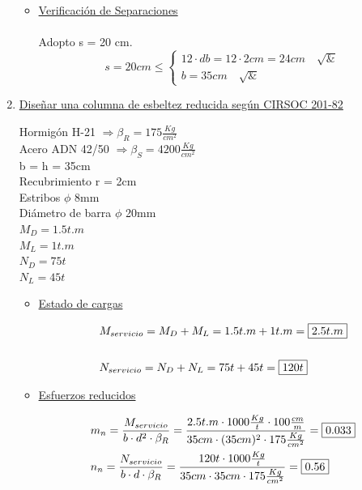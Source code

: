 \begin{enumerate}
\begin{itemize}
\item \underline{Verificación de Separaciones}\\
\\
Adopto s = 20 cm.\\
\[ s = 20cm \leq \left\{ \begin{array}{ll}
         12 \cdot db = 12 \cdot 2cm = 24cm \quad \surd &\\
         b = 35cm \quad \surd & \end{array} \right. \] 
\end{itemize}
\newpage
\item \underline{Diseñar una columna de esbeltez reducida según CIRSOC 201-82}

Hormigón H-21 $\Rightarrow \beta_R = 175 \frac{Kg}{cm^2}$\\
Acero ADN 42/50 $\Rightarrow \beta_S = 4200 \frac{Kg}{cm^2}$\\
b = h = 35cm\\
Recubrimiento r = 2cm\\
Estribos $\phi$ 8mm\\
Diámetro de barra $\phi$ 20mm\\
$M_D = 1.5t.m$\\
$M_L = 1t.m$\\
$N_D = 75t$\\
$N_L = 45t$\\

\begin{itemize}
\item \underline{Estado de cargas}

\begin{align*}
& M_{servicio} = M_D + M_L = 1.5 t.m + 1 t.m = \framebox{$2.5t.m$}\\
& \\
& N_{servicio} = N_D + N_L = 75 t + 45 t = \framebox{$120t$}
\end{align*}

\item \underline{Esfuerzos reducidos}

\begin{align*}
& m_{n} = \frac{M_{servicio}}{b \cdot d^2 \cdot \beta_R} = \frac{2.5t.m \cdot 1000\frac{Kg}{t} \cdot 100\frac{cm}{m}}{35cm \cdot (35cm)^2 \cdot 175 \frac{Kg}{cm^2}} = \framebox{0.033}\\
& n_{n} = \frac{N_{servicio}}{b \cdot d \cdot \beta_R} = \frac{120t \cdot 1000\frac{Kg}{t}}{35cm \cdot 35cm\cdot 175 \frac{Kg}{cm^2}} = \framebox{0.56}
\end{align*}


\end{itemize}
\end{enumerate}
